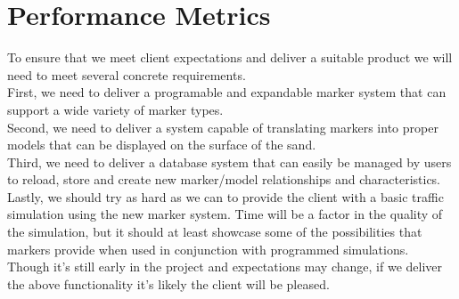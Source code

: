 \documentclass[letterpaper, 10pt, onecolumn, draftclsnofoot]{IEEEtran}
\begin{document}
\section{Performance Metrics}
To ensure that we meet client expectations and deliver a suitable product we will need to meet several concrete requirements.\\
First, we need to deliver a programable and expandable marker system that can support a wide variety of marker types.\\
Second, we need to deliver a system capable of translating markers into proper models that can be displayed on the surface of the sand.\\ 
Third, we need to deliver a database system that can easily be managed by users to reload, store and create new marker/model relationships and characteristics.\\
Lastly, we should try as hard as we can to provide the client with a basic traffic simulation using the new marker system. Time will be a factor in the quality of the simulation, but it should at least showcase some of the possibilities that markers provide when used in conjunction with programmed simulations.\\
Though it’s still early in the project and expectations may change, if we deliver the above functionality it’s likely the client will be pleased.\\
\end{document}
